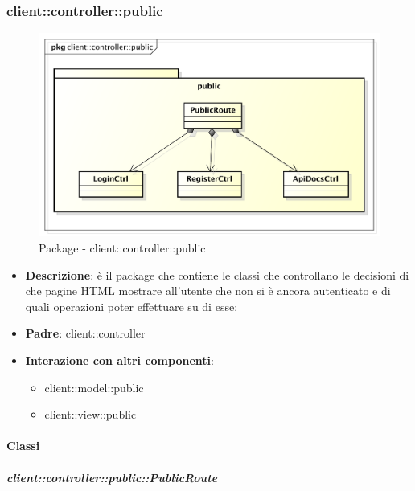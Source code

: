 \subsubsection{client::controller::public} %
\label{ssub:bdsm_app_client_controller_public}
\begin{figure}[htbp]
	\centering
	\centerline{\includegraphics[scale=0.6]{./images/client/client_controller_public.pdf}}
	\caption{Package - client::controller::public}
\end{figure}

\begin{itemize}
	\item \textbf{Descrizione}: è il package che contiene le classi che controllano le decisioni di che pagine HTML mostrare all'utente che non si è ancora autenticato e di quali operazioni poter effettuare su di esse;
	\item \textbf{Padre}: client::controller
	\item \textbf{Interazione con altri componenti}:
		\begin{itemize}
			\item client::model::public
			\item client::view::public
		\end{itemize}
\end{itemize}

	\paragraph{Classi} %
		\subparagraph{client::controller::public::PublicRoute} %
		\label{subp:bdsm_app_client_controller_public_publicrouteconfig}

